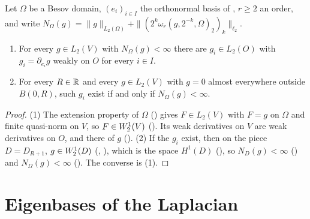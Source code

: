 \begin{lemma}[$\Sob{1}{2} = B^1_{2,2}$ for functions vanishing outside a ball]
\label{lem:besov-domain-weak-gradient}
\leanok
{}
Let $\Omega$ be a Besov domain, $(e_i)_{i \in I}$ the orthonormal basis of
, $r \geq 2$ an order, and write
$N_\Omega(g) = \|g\|_{L_2(\Omega)} + \|(2^k \omega_r(g, 2^{-k}, \Omega)_2)_k\|_{\ell_2}$.
\begin{enumerate}
  \item For every $g \in L_2(V)$ with $N_\Omega(g) < \infty$ there are $g_i \in L_2(O)$ with
    $g_i = \partial_{e_i} g$ weakly on $O$ for every $i \in I$.
  \item For every $R \in \mathbb{R}$ and every $g \in L_2(V)$ with $g = 0$ almost everywhere outside
    $B(0, R)$, such $g_i$ exist if and only if $N_\Omega(g) < \infty$.
\end{enumerate}
\end{lemma}

\begin{proof}
\leanok
(1) The extension property of $\Omega$ () gives $F \in L_2(V)$
with $F = g$ on $\Omega$ and finite quasi-norm on $V$, so $F \in W^{1}_{2}(V)$
(). Its weak derivatives on $V$ are weak derivatives on $O$, and
there of $g$ (). (2) If the $g_i$ exist, then on the piece
$D = D_{R+1}$, $g \in W^{1}_{2}(D)$ (,
), which is the space $H^1(D)$
(), so $N_D(g) < \infty$
() and $N_\Omega(g) < \infty$
(). The converse is (1).
\end{proof}



\chapter{Eigenbases of the Laplacian}
\label{ch:laplacian-eigenbases}

